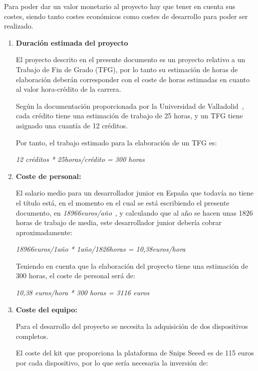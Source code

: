 Para poder dar un valor monetario al proyecto hay que tener en cuenta sus costes, siendo tanto costes económicos como costes de desarrollo para poder ser realizado.

\begin{enumerate}
    \item \textbf{Duración estimada del proyecto} \label{duracion_proyecto}
    
El proyecto descrito en el presente documento es un proyecto relativo a un Trabajo de Fin de Grado (TFG), por lo tanto su estimación de horas de elaboración deberán corresponder con el coste de horas estimadas en cuanto al valor hora-crédito de la carrera.

Según la documentación proporcionada por la Universidad de Valladolid~\cite{hxc}, cada crédito tiene una estimación de trabajo de 25 horas, y un TFG tiene asignado una cuantía de 12 créditos.

Por tanto, el trabajo estimado para la elaboración de un TFG es:

\begin{center}
    \textit{12 créditos * 25horas/crédito = 300 horas}
\end{center}

    \item\textbf{ Coste de personal:}
    
El salario medio para un desarrollador junior en España que todavía no tiene el título está, en el momento en el cual se está escribiendo el presente documento, en \textit{18966euros/año}~\cite{salario-junior}, y calculando que al año se hacen unas 1826 horas de trabajo de media, este desarrollador junior debería cobrar aproximadamente:

\begin{center}
    \textit{18966euros/1año * 1año/1826horas = 10,38euros/hora}
\end{center}

Teniendo en cuenta que la elaboración del proyecto tiene una estimación de 300 horas, el coste de personal será de:

\begin{center}
    \textit{10,38 euros/hora * 300 horas = 3116 euros}
\end{center}

    \item \textbf{ Coste del equipo: }
    
Para el desarrollo del proyecto se necesita la adquisición de dos dispositivos completos.

El coste del kit que proporciona la plataforma de Snips Seeed es de 115 euros por cada dispositivo, por lo que sería necesaria la inversión de:


\end{enumerate}
